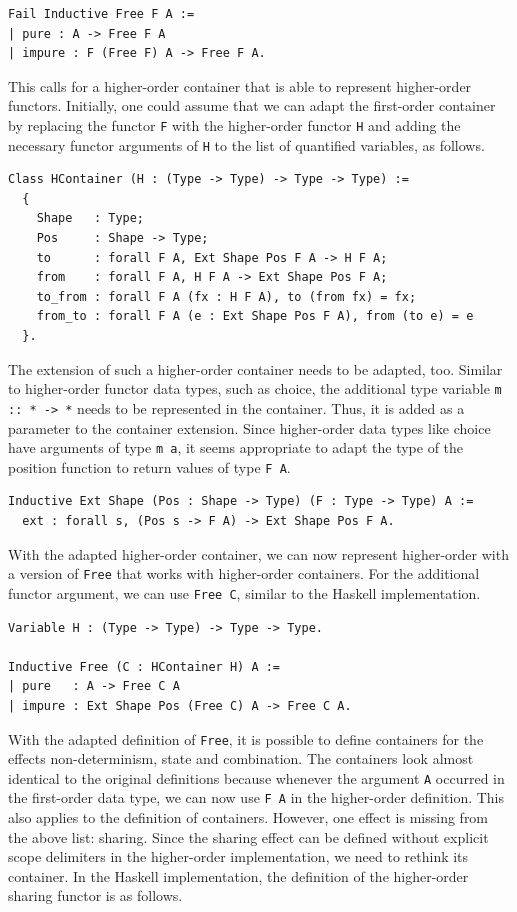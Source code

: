 \documentclass[a4paper, 11pt, fleqn, twoside]{scrreprt}
\newcommand{\hinl}[1]{\texttt{#1}}
\newcommand{\cinl}[1]{\texttt{#1}}
\begin{document}
\begin{verbatim}
Fail Inductive Free F A :=
| pure : A -> Free F A
| impure : F (Free F) A -> Free F A.
\end{verbatim}

This calls for a higher-order container that is able to represent higher-order functors.
Initially, one could assume that we can adapt the first-order container by replacing the functor \cinl{F} with the higher-order functor \cinl{H} and adding the necessary functor arguments of \cinl{H} to the list of quantified variables, as follows.

\begin{verbatim}
Class HContainer (H : (Type -> Type) -> Type -> Type) :=
  {
    Shape   : Type;
    Pos     : Shape -> Type;
    to      : forall F A, Ext Shape Pos F A -> H F A;
    from    : forall F A, H F A -> Ext Shape Pos F A;
    to_from : forall F A (fx : H F A), to (from fx) = fx;
    from_to : forall F A (e : Ext Shape Pos F A), from (to e) = e
  }.
\end{verbatim}

The extension of such a higher-order container needs to be adapted, too.
Similar to higher-order functor data types, such as choice, the additional type variable \hinl{m :: * -> *} needs to be represented in the container.
Thus, it is added as a parameter to the container extension.
Since higher-order data types like choice have arguments of type \hinl{m a}, it seems appropriate to adapt the type of the position function to return values of type \cinl{F A}.

\begin{verbatim}
Inductive Ext Shape (Pos : Shape -> Type) (F : Type -> Type) A := 
  ext : forall s, (Pos s -> F A) -> Ext Shape Pos F A.
\end{verbatim}

With the adapted higher-order container, we can now represent higher-order with a version of \cinl{Free} that works with higher-order containers.
For the additional functor argument, we can use \cinl{Free C}, similar to the Haskell implementation.

\begin{verbatim}
Variable H : (Type -> Type) -> Type -> Type.

Inductive Free (C : HContainer H) A :=
| pure   : A -> Free C A
| impure : Ext Shape Pos (Free C) A -> Free C A.
\end{verbatim}

With the adapted definition of \cinl{Free}, it is possible to define containers for the effects non-determinism, state and combination.
The containers look almost identical to the original definitions because whenever the argument \cinl{A} occurred in the first-order data type, we can now use \cinl{F A} in the higher-order definition.
This also applies to the definition of containers.
However, one effect is missing from the above list: sharing.
Since the sharing effect can be defined without explicit scope delimiters in the higher-order implementation, we need to rethink its container.
In the Haskell implementation, the definition of the higher-order sharing functor is as follows.
\end{document}
